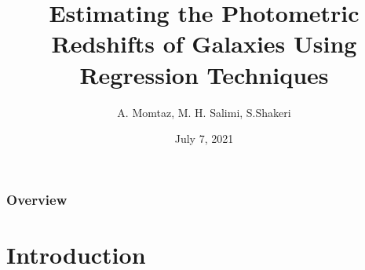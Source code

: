 \documentclass{beamer}
\title[Photometric Redshifts]{Estimating the Photometric Redshifts of Galaxies Using Regression Techniques} %
\author[Momtaz, Salimi, Shakeri]{ A. Momtaz, M. H. Salimi, S.Shakeri}
\institute[IUT] %
{
Department of Physics, Isfahan University of Technology, Isfahan 84156-8311, Iran. \\ %
\medskip
\textit{aidinmomtaz@ph.iut.ac.ir\\mhsalimi@ph.iut.ac.ir\\s.shakeri@iut.ac.ir} %
}
\date{July 7, 2021} %
\begin{document}
\begin{frame}
\titlepage %
\end{frame}


\begin{frame}
\frametitle{Overview} %
\tableofcontents %
\end{frame}

\section{Introduction}
\end{document}
